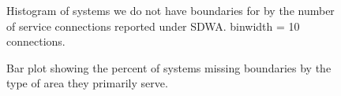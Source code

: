 \documentclass[12pt]{article}
\begin{document}
\begin{figure}


\caption{\label{fig-missingCon}Histogram of systems we do not have
boundaries for by the number of service connections reported under SDWA.
binwidth = 10 connections.}

\end{figure}%

\begin{figure}


\caption{\label{fig-missingType}Bar plot showing the percent of systems
missing boundaries by the type of area they primarily serve.}

\end{figure}%
\end{document}
